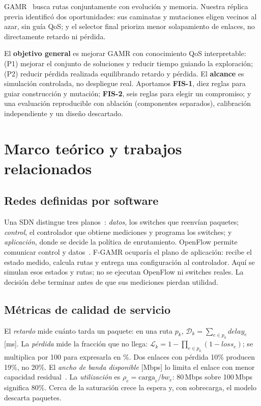 \documentclass[conference]{IEEEtran}
\newcommand{\Dc}{\mathcal{D}}
\newcommand{\Lc}{\mathcal{L}}
\begin{document}
GAMR~\cite{tran2025gamr} busca rutas conjuntamente con evolución y memoria. Nuestra réplica previa identificó dos oportunidades: sus caminatas y mutaciones eligen vecinos al azar, sin guía QoS; y el selector final prioriza menor solapamiento de enlaces, no directamente retardo ni pérdida.

El \textbf{objetivo general} es mejorar GAMR con conocimiento QoS interpretable: (P1) mejorar el conjunto de soluciones y reducir tiempo guiando la exploración; (P2) reducir pérdida realizada equilibrando retardo y pérdida. El \textbf{alcance} es simulación controlada, no despliegue real. Aportamos \textbf{FIS-1}, diez reglas para guiar construcción y mutación; \textbf{FIS-2}, seis reglas para elegir un compromiso; y una evaluación reproducible con ablación (componentes separados), calibración independiente y un diseño descartado.

\section{Marco teórico y trabajos relacionados}
\subsection{Redes definidas por software}
Una SDN distingue tres planos~\cite{kreutz2015sdn}: \emph{datos}, los switches que reenvían paquetes; \emph{control}, el controlador que obtiene mediciones y programa los switches; y \emph{aplicación}, donde se decide la política de enrutamiento. OpenFlow permite comunicar control y datos~\cite{mckeown2008openflow}. F-GAMR ocuparía el plano de aplicación: recibe el estado medido, calcula rutas y entrega una configuración al controlador. Aquí se simulan esos estados y rutas; no se ejecutan OpenFlow ni switches reales. La decisión debe terminar antes de que sus mediciones pierdan utilidad.

\subsection{Métricas de calidad de servicio}
El \emph{retardo} mide cuánto tarda un paquete: en una ruta $p_k$, $\Dc_k=\sum_{e\in p_k}delay_e$ [ms]. La \emph{pérdida} mide la fracción que no llega: $\Lc_k=1-\prod_{e\in p_k}(1-loss_e)$; se multiplica por 100 para expresarla en \%. Dos enlaces con pérdida 10\% producen 19\%, no 20\%. El \emph{ancho de banda disponible} [Mbps] lo limita el enlace con menor capacidad residual~\cite{tran2025gamr,wang1996qos}. La \emph{utilización} es $\rho_e=\text{carga}_e/bw_e$: 80\,Mbps sobre 100\,Mbps significa 80\%. Cerca de la saturación crece la espera y, con sobrecarga, el modelo descarta paquetes.
\end{document}
